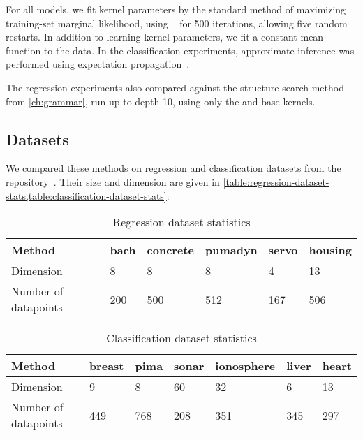 For all \gp{} models, we fit kernel parameters by the standard method of maximizing training-set marginal likelihood, using \LBFGS{}~\citep{nocedal1980updating} for 500 iterations, allowing five random restarts.
In addition to learning kernel parameters, we fit a constant mean function to the data.
In the classification experiments, approximate \gp{} inference was performed using expectation propagation~\citep{minka2001expectation}.

The regression experiments also compared against the structure search method from \cref{ch:grammar}, run up to depth 10, using only the \SE{} and \RQ{} base kernels.



\subsection{Datasets}

We compared these methods on regression and classification datasets from the \UCI{} repository~\citep{UCI}.
Their size and dimension are given in \cref{table:regression-dataset-stats,table:classification-dataset-stats}:

\begin{table}[h]
\caption{Regression dataset statistics}
\label{tbl:Regression Dataset Statistics}
\begin{center}
\begin{tabular}{l | lllll}
Method & bach & concrete & pumadyn & servo & housing \\ \hline
Dimension      & 8    & 8        & 8       & 4     & 13 \\
Number of datapoints       & 200  & 500      & 512     & 167   & 506
\end{tabular}
\end{center}
\label{table:regression-dataset-stats}
\end{table}
%
\begin{table}[h]
\caption{Classification dataset statistics}
\label{tbl:Classification Dataset Statistics}
\begin{center}
\begin{tabular}{l | llllll}
Method & breast & pima & sonar & ionosphere & liver & heart\\ \hline
Dimension      & 9      & 8    & 60    & 32         & 6     & 13 \\
Number of datapoints      & 449    & 768  & 208   & 351        & 345   & 297
\end{tabular}
\end{center}
\label{table:classification-dataset-stats}
\end{table}

